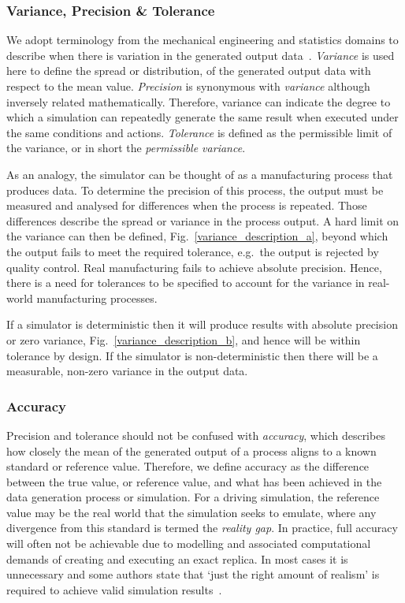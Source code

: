 \subsubsection{Variance, Precision \& Tolerance}
We adopt terminology from the mechanical engineering and statistics domains to describe when there is variation in the generated output data~\cite{ADictionaryofMechanicalEngineering}. \textit{Variance} is used here to define the spread or distribution, of the generated output data with respect to the mean value. \textit{Precision} is synonymous with \textit{variance} although inversely related mathematically. Therefore, variance can indicate the degree to which a simulation can repeatedly generate the same result when executed under the same conditions and actions. \textit{Tolerance} is defined as the permissible limit of the variance, or in short the \textit{permissible variance}. 

As an analogy, the simulator can be thought of as a manufacturing process that produces data. To determine the precision of this process, the output must be measured and analysed for differences when the process is repeated. Those differences describe the spread or variance in the process output. A hard limit on the variance can then be defined, Fig.~\ref{variance_description_a}, beyond which the output fails to meet the required tolerance, e.g.\ the output is rejected by quality control. Real manufacturing fails to achieve absolute precision. Hence, there is a need for tolerances to be specified to account for the variance in real-world manufacturing processes. 

If a simulator is deterministic then it will produce results with absolute precision or zero variance, Fig.~\ref{variance_description_b}, and hence will be within tolerance by design. If the simulator is non-deterministic then there will be a measurable, non-zero variance in the output data.\\
%

\subsubsection{Accuracy}
Precision and tolerance should not be confused with \textit{accuracy}, which describes how closely the mean of the generated output of a process aligns to a known standard or reference value. Therefore, we define accuracy as the difference between the true value, or reference value, and what has been achieved in the data generation process or simulation. 
%
For a driving simulation, the reference value may be the real world that the simulation seeks to emulate, where any divergence from this standard is termed the \textit{reality gap}. 
%
In practice, full accuracy will often not be achievable due to modelling and associated computational demands of creating and executing an exact replica. In most cases it is unnecessary and some authors state that `just the right amount of realism' is required to achieve valid simulation results~\cite{Koopman2018}. \\

